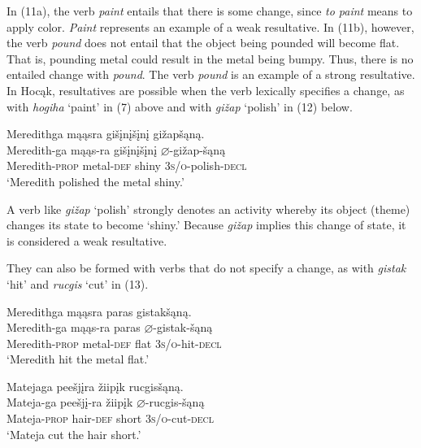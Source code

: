 \documentclass[output=paper]{LSP/langsci}
\begin{document}
\begin{exe}
\ex
\begin{xlist}



\end{xlist}
\end{exe}

In (11a), the verb \textit{paint} entails that there is some change, since \textit{to paint} means to apply color. \textit{Paint} represents an example of a weak resultative. In (11b), however, the verb \textit{pound} does not entail that the object being pounded will become flat. That is, pounding metal could result in the metal being bumpy. Thus, there is no entailed change with \textit{pound}. The verb \textit{pound} is an example of a strong resultative. In Hocąk, resultatives are possible when the verb lexically specifies a change, as with \textit{hogiha} `paint' in (7) above and with \textit{gižap} `polish' in (12) below.

\begin{exe}

\ex \glll Meredithga mąąsra gišįnįšįnį gižapšąną.  \\
 Meredith-ga mąąs-ra gišįnįšįnį {$\varnothing$}-gižap-šąną\\
 Meredith-\textsc{prop} metal-\textsc{def} shiny \textsc{3s/o}-polish-\textsc{decl}\\
\glt `Meredith polished the metal shiny.'

\end{exe}

A verb like \textit{gižap} `polish' strongly denotes an activity whereby its object (theme) changes its state to become `shiny.' Because \textit{gižap} implies this change of state, it is considered a weak resultative. 

They can also be formed with verbs that do not specify a change, as with \textit{gistak} `hit' and \textit{rucgis} `cut' in (13).

\begin{exe}
\ex
\begin{xlist}

\ex \glll Meredithga mąąsra paras gistakšąną. \\
 Meredith-ga mąąs-ra paras {$\varnothing$}-gistak-šąną\\
Meredith-\textsc{prop} metal-\textsc{def} flat \textsc{3s/o}-hit-\textsc{decl}\\
\glt `Meredith hit the metal flat.'

\ex \glll Matejaga peešjįra žiipįk rucgisšąną.\\
Mateja-ga peešjį-ra žiipįk {$\varnothing$}-rucgis-šąną\\
Mateja-\textsc{prop} hair-\textsc{def} short \textsc{3s/o}-cut-\textsc{decl}\\
\glt `Mateja cut the hair short.'

\end{xlist}
\end{exe}
\end{document}
